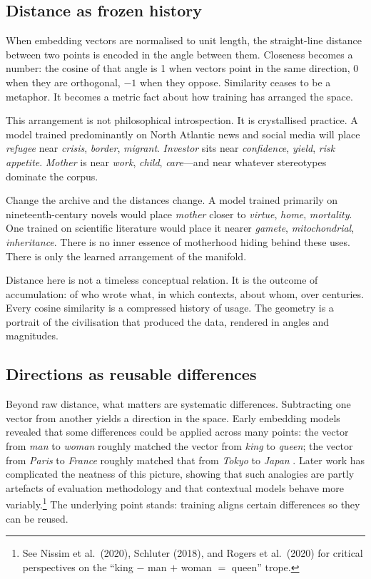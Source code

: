 \documentclass[12pt,a4paper]{article}
\begin{document}
\subsection*{Distance as frozen history}

When embedding vectors are normalised to unit length, the straight-line distance between two points is encoded in the angle between them. Closeness becomes a number: the cosine of that angle is 1 when vectors point in the same direction, 0 when they are orthogonal, $-1$ when they oppose. Similarity ceases to be a metaphor. It becomes a metric fact about how training has arranged the space.

This arrangement is not philosophical introspection. It is crystallised practice. A model trained predominantly on North Atlantic news and social media will place \emph{refugee} near \emph{crisis}, \emph{border}, \emph{migrant}. \emph{Investor} sits near \emph{confidence}, \emph{yield}, \emph{risk appetite}. \emph{Mother} is near \emph{work}, \emph{child}, \emph{care}---and near whatever stereotypes dominate the corpus.

Change the archive and the distances change. A model trained primarily on nineteenth-century novels would place \emph{mother} closer to \emph{virtue}, \emph{home}, \emph{mortality}. One trained on scientific literature would place it nearer \emph{gamete}, \emph{mitochondrial}, \emph{inheritance}. There is no inner essence of motherhood hiding behind these uses. There is only the learned arrangement of the manifold.

Distance here is not a timeless conceptual relation. It is the outcome of accumulation: of who wrote what, in which contexts, about whom, over centuries. Every cosine similarity is a compressed history of usage. The geometry is a portrait of the civilisation that produced the data, rendered in angles and magnitudes.

\subsection*{Directions as reusable differences}

Beyond raw distance, what matters are systematic differences. Subtracting one vector from another yields a direction in the space. Early embedding models revealed that some differences could be applied across many points: the vector from \emph{man} to \emph{woman} roughly matched the vector from \emph{king} to \emph{queen}; the vector from \emph{Paris} to \emph{France} roughly matched that from \emph{Tokyo} to \emph{Japan} \cite{mikolov2013,pennington2014}. Later work has complicated the neatness of this picture, showing that such analogies are partly artefacts of evaluation methodology and that contextual models behave more variably.\footnote{See Nissim et al.\ (2020), Schluter (2018), and Rogers et al.\ (2020) for critical perspectives on the ``king $-$ man $+$ woman $=$ queen'' trope.} The underlying point stands: training aligns certain differences so they can be reused.
\end{document}
